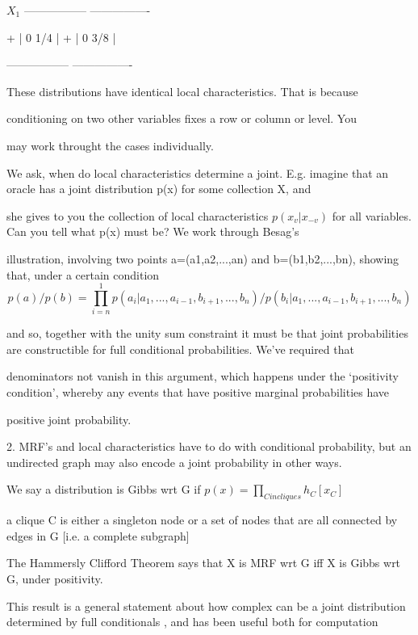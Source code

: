 \documentclass[11pt,a4paper]{article}
\begin{document}
	$X_1 $      -----------------                     ----------------
	
	+  |   0      1/4  |                   + |   0     3/8  |
	
	-----------------                     ----------------
	
	These distributions have identical local characteristics.  That is because
	
	conditioning on two other variables fixes a row or column or level.  You
	
	may work throught the cases individually.  
	
	We ask, when do local characteristics determine a joint.  E.g. imagine that an oracle has a joint distribution p(x) for some collection X, and
	
	she gives to you the collection of local characteristics $p(x_v | x_{-v} )$ for all variables.  Can you tell what p(x) must be?  We work through Besag's 
	
	illustration, involving two points a=(a1,a2,...,an) and b=(b1,b2,...,bn), showing that, under a certain condition
	\begin{equation}
	p(a)/p(b) = \prod_{i=n}^1 p(a_i| a_1,...,a_{i-1}, b_{i+1},...,b_n )/p(b_i|a_1,...,a_{i-1}, b_{i+1},...,b_n)
	\end{equation}
	 
	
	and so, together with the unity sum constraint it must be that joint probabilities are constructible for full conditional probabilities.  We've required that
	
	denominators not vanish in this argument, which happens under the `positivity condition', whereby any events that have positive marginal probabilities have
	
	positive joint probability.
	
	2. MRF's and local characteristics have to do with conditional probability, but an undirected graph may also encode a joint probability in other ways.
	
	We say a distribution is Gibbs wrt G if $p(x) = \prod_{C in cliques}  h_C[ x_C ]$
	
	a clique C is either a singleton node or a set of nodes that are all connected by edges in G [i.e. a complete subgraph]
	
	The Hammersly Clifford Theorem says that X is MRF wrt G iff X is Gibbs wrt G, under positivity.
	
	This result is a general statement about how complex can be a joint distribution determined by full conditionals , and has been useful both for computation
	
\end{document}
